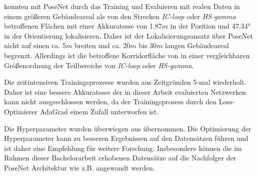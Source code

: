 
\citet{walchImageBasedLocalizationUsing2017} konnten mit PoseNet durch das Training und Evaluieren mit realen Daten in einem größeren Gebäudeareal als von den Strecken \textit{IC-loop} oder \textit{HS-gamma} betroffenen Flächen mit einer Akkuratesse von 1.87$m$ in der Position und 47.34° in der Orientierung lokalisieren. Daher ist der Lokalisierungsansatz über PoseNet nicht auf einen ca. 5$m$ breiten und ca. 20$m$ bis 30$m$ langen Gebäudeareal begrenzt. Allerdings ist die betroffene Korridorfläche von \citet{acharyaBIMPoseNetIndoorCamera2019} in einer vergleichbaren Größenordnung der Teilbereiche von \textit{IC-loop} oder \textit{HS-gamma}.







%






Die zeitintensiven Trainingsprozesse wurden aus Zeitgründen 5-mal wiederholt. Daher ist eine bessere Akkuratesse der in dieser Arbeit evaluierten Netzwerken kann nicht ausgeschlossen werden, da der Trainingsprozess durch den Loss-Optimierer AdaGrad einem Zufall unterworfen ist.

Die Hyperparameter wurden überwiegen aus \citet{acharyaBIMPoseNetIndoorCamera2019} übernommen. Die Optimierung der Hyperparameter kann zu besseren Ergebnissen auf den Datensätzen führen und ist daher eine Empfehlung für weitere Forschung. Insbesondere können die im Rahmen dieser Bachelorarbeit erhobenen Datensätze auf die Nachfolger der PoseNet Architektur wie z.B. \cite{kendallModellingUncertaintyDeep2016, walchImageBasedLocalizationUsing2017, kendallGeometricLossFunctions2017, clarkVidLocDeepSpatioTemporal2017} angewandt werden.


% 

